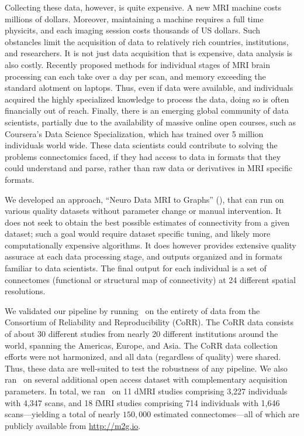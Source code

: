 \documentclass[11pt]{article}
\begin{document}
Collecting these data, however, is quite expensive.  A new MRI machine costs millions of dollars.  Moreover, maintaining a machine requires a full time physicits, and each imaging session  costs thousands of US dollars.  Such obstancles limit the acquisition of data to relatively rich countries, institutions, and researchers.  It is not just data acquisition that is expensive, data analysis is also costly.  Recently proposed methods for individual stages of MRI brain processing can each take over a day per scan, and memory exceeding the standard alotment on laptops.  Thus, even if data were available, and individuals acquired the highly specialized knowledge to process the data, doing so is often financially out of reach.  Finally, there is an emerging global community of data scientists, partially due to the availability of massive online open courses, such as Coursera's Data Science Specialization, which has trained over 5 million individuals world wide.  These data scientists could contribute to solving the problems connectomics faced, if they had access to data in formats that they could understand and parse, rather than raw data or derivatives in MRI specific formats. 




We developed an approach, ``Neuro Data MRI to Graphs'' (\ndmg), that 
can run on various quality datasets without parameter change or manual intervention. It does not seek to obtain the best possible estimates of connectivity from a given dataset; such a goal would require dataset specific tuning, and likely more computationally expensive algorithms. It does however provides extensive quality assurace at each data processing stage, and outputs organized and in formats familiar to data scientists.  The final output for each individual is a set of connectomes (functional or structural map of connectivity) at 24 different spatial resolutions.



We validated our pipeline by running \ndmg~on the entirety of data from the Consortium of Reliability and Reproducibility (CoRR).  The CoRR data  consists of about 30 different studies from nearly 20 different institutions around the world, spanning the Americas, Europe, and Asia. The CoRR data collection efforts were not harmonized, and all data (regardless of quality) were shared.  Thus, these data are well-suited to test the robustness of any pipeline.  We also ran \ndmg~on several additional open access dataset with complementary acquisition parameters. In total, we ran \ndmg~on 11 dMRI  studies comprising 3,227 individuals with 4,347 scans, and 18 fMRI  studies comprising 714 individuals with 1,646 scans---yielding a total of nearly  $150,000$ estimated connectomes---all of which are publicly available from \url{http://m2g.io}. 
\end{document}
